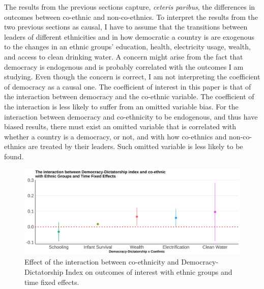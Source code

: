 \documentclass{wptemp}
\begin{document}
The results from the previous sections capture, \textit{ceteris paribus}, the differences in outcomes between co-ethnic and non-co-ethnics. To interpret the results from the two previous sections as causal, I have to assume that the transitions between leaders of different ethnicities and in how democratic a country is are exogenous to the changes in an ethnic groups' education, health, electricity usage, wealth, and access to clean drinking water. A concern might arise from the fact that democracy is endogenous and is probably correlated with the outcomes I am studying. Even though the concern is correct, I am not interpreting the coefficient of democracy as a causal one. The coefficient of interest in this paper is that of the interaction between democracy and the co-ethnic variable. The coefficient of the interaction is less likely to suffer from an omitted variable bias. For the interaction between democracy and co-ethnicity to be endogenous, and thus have biased results, there must exist an omitted variable that is correlated with whether a country is a democracy, or not, and with how co-ethnics and non-co-ethnics are treated by their leaders. Such omitted variable is less likely to be found.

\begin{figure}[!htb]
\centering
\includegraphics[width=.9\linewidth]{figure/coeth_demdic_ctFE.png}
\caption{Effect of the interaction between co-ethnicity and Democracy-Dictatorship Index on outcomes of interest with ethnic groups and time fixed effects.}
\label{fig:demdicindex}
\end{figure}
\end{document}
